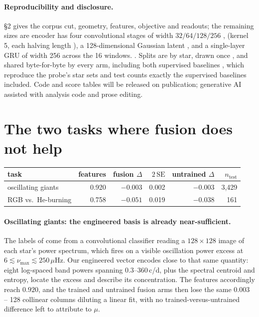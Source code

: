 \documentclass{article}
\providecommand{\DIFaddtex}[1]{{\protect\color{blue} \sf #1}} %
\providecommand{\DIFdeltex}[1]{{\protect\color{red} \scriptsize #1}} %
\providecommand{\DIFaddbegin}{} %
\providecommand{\DIFaddend}{} %
\providecommand{\DIFdelbegin}{} %
\providecommand{\DIFdelend}{} %
\providecommand{\DIFadd}[1]{\texorpdfstring{\DIFaddtex{#1}}{#1}} %
\providecommand{\DIFdel}[1]{\texorpdfstring{\DIFdeltex{#1}}{}} %
\providecommand{\DIFscaledelfig}{0.5}
\newlength{\DIFdelgraphicswidth} %
\newlength{\DIFdelgraphicsheight} %
\providecommand{\DIFaddincludegraphics}[2][]{{\color{blue}\fbox{\DIFOincludegraphics[#1]{#2}}}} %
\providecommand{\DIFdelincludegraphics}[2][]{%
\sbox{\DIFdelgraphicsbox}{\DIFOincludegraphics[#1]{#2}}%
\settoboxwidth{\DIFdelgraphicswidth}{\DIFdelgraphicsbox} %
\settoboxtotalheight{\DIFdelgraphicsheight}{\DIFdelgraphicsbox} %
\scalebox{\DIFscaledelfig}{%
\parbox[b]{\DIFdelgraphicswidth}{\usebox{\DIFdelgraphicsbox}\\[-\baselineskip] \rule{\DIFdelgraphicswidth}{0em}}\llap{\resizebox{\DIFdelgraphicswidth}{\DIFdelgraphicsheight}{%
\setlength{\unitlength}{\DIFdelgraphicswidth}%
\begin{picture}(1,1)%
\thicklines\linethickness{2pt} %
{\color[rgb]{1,0,0}\put(0,0){\framebox(1,1){}}}%
{\color[rgb]{1,0,0}\put(0,0){\line( 1,1){1}}}%
{\color[rgb]{1,0,0}\put(0,1){\line(1,-1){1}}}%
\end{picture}%
}\hspace*{3pt}}} %
} %
\DeclareRobustCommand{\DIFaddbegin}{\DIFOaddbegin \let\includegraphics\DIFaddincludegraphics} %
\DeclareRobustCommand{\DIFaddend}{\DIFOaddend \let\includegraphics\DIFOincludegraphics} %
\DeclareRobustCommand{\DIFdelbegin}{\DIFOdelbegin \let\includegraphics\DIFdelincludegraphics} %
\DeclareRobustCommand{\DIFdelend}{\DIFOaddend \let\includegraphics\DIFOincludegraphics} %
\begin{document}
\paragraph{Reproducibility and disclosure.} \S2 gives the corpus cut, geometry, features, objective
and readouts; the \DIFdelbegin \DIFdel{remaining sizes are }\DIFdelend \DIFaddbegin \DIFadd{encoder has }\DIFaddend four convolutional stages of width $32/64/128/256$ \DIFdelbegin \DIFdel{, }\DIFdelend \DIFaddbegin \DIFadd{(}\DIFaddend kernel 5, each
halving length\DIFaddbegin \DIFadd{)}\DIFaddend , a 128-dimensional Gaussian latent \DIFdelbegin \DIFdel{, }\DIFdelend and a single-layer GRU of width \DIFdelbegin \DIFdel{256 across the
16 windows. }\DIFdelend \DIFaddbegin \DIFadd{256. }\DIFaddend Splits are by
star, drawn once \DIFdelbegin \DIFdel{, }\DIFdelend and shared byte-for-byte by every arm, \DIFdelbegin \DIFdel{including both
supervised baselines , which reproduce the probe's star sets and test counts exactly}\DIFdelend \DIFaddbegin \DIFadd{the supervised baselines included}\DIFaddend . Code and
score tables will be released on publication; generative AI assisted with analysis code and prose editing.




\appendix

\section{The two tasks where fusion does not help}
\label{app:negatives}

\begin{center}
\small
\begin{tabular}{lrrrrr}
\toprule
task & features & fusion $\Delta$ & $2\,\mathrm{SE}$ & untrained $\Delta$ & $n_{\mathrm{test}}$ \\
\midrule
oscillating giants & 0.920 & $-0.003$ & 0.002 & $-0.003$ & 3{,}429 \\
RGB vs.\ He-burning & 0.758 & $-0.051$ & 0.019 & $-0.038$ & 161 \\
\bottomrule
\end{tabular}
\end{center}

\paragraph{Oscillating giants: the engineered basis is already near-sufficient.} The labels of
\citet{hon2021} come from a convolutional classifier reading a $128 \times 128$ image of each star's
power spectrum, which fires on a visible oscillation power excess at
$6 \lesssim \nu_{\max} \lesssim 250\,\mu$Hz. Our engineered vector encodes close to that same
quantity: eight log-spaced band powers spanning 0.3--360\,c/d, plus the spectral centroid and
entropy, locate the excess and describe its concentration. The features accordingly reach $0.920$,
and the trained and untrained fusion arms then lose the same $0.003$ -- 128 collinear columns
diluting a linear fit, with no trained-versus-untrained difference left to attribute to $\mu$.
\end{document}

